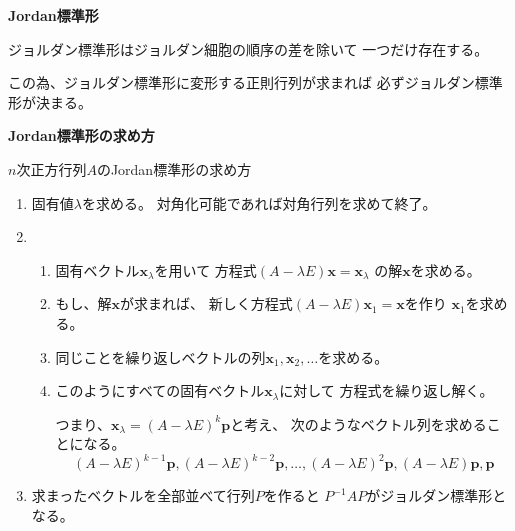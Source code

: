 \documentclass[12pt,b5paper]{ltjsarticle}
\begin{document}
\hrulefill

\textbf{Jordan標準形}

ジョルダン標準形はジョルダン細胞の順序の差を除いて
一つだけ存在する。

この為、ジョルダン標準形に変形する正則行列が求まれば
必ずジョルダン標準形が決まる。


\dotfill

\textbf{Jordan標準形の求め方}

$n$次正方行列$A$のJordan標準形の求め方

\begin{enumerate}
 \item
      固有値$\lambda$を求める。
      対角化可能であれば対角行列を求めて終了。

 \item
      \begin{enumerate}
       \item
            固有ベクトル$\bm{x}_{\lambda}$を用いて
            方程式$(A-\lambda E)\bm{x} = \bm{x}_{\lambda}$
            の解$\bm{x}$を求める。

       \item
            もし、解$\bm{x}$が求まれば、
            新しく方程式$(A-\lambda E)\bm{x}_1 = \bm{x}$を作り
            $\bm{x}_1$を求める。

       \item
            同じことを繰り返しベクトルの列$\bm{x}_1,\bm{x}_2,\dots$を求める。

       \item
            このようにすべての固有ベクトル$\bm{x}_{\lambda}$に対して
            方程式を繰り返し解く。

            つまり、$\bm{x}_{\lambda}=(A-\lambda E)^k \bm{p}$と考え、
            次のようなベクトル列を求めることになる。
            \begin{equation}
            (A-\lambda E)^{k-1} \bm{p},(A-\lambda E)^{k-2} \bm{p},\dots,
            (A-\lambda E)^2 \bm{p},(A-\lambda E) \bm{p},\bm{p}
            \end{equation}

      \end{enumerate}

 \item
      求まったベクトルを全部並べて行列$P$を作ると
      $P^{-1}AP$がジョルダン標準形となる。

\end{enumerate}

\hrulefill
\end{document}

